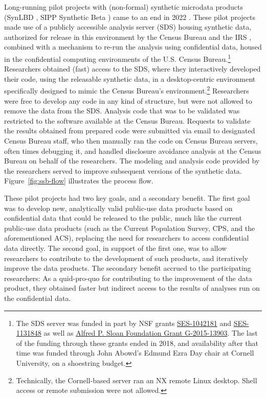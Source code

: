 \documentclass[inline]{hdsr}
\begin{document}
Long-running pilot projects with (non-formal) synthetic microdata products (SynLBD \citep{KinneyEtAl2011,us_census_bureau_synthetic_2011,vilhuber_codebook_2013}, SIPP Synthetic Beta \citep{Benedettoetal_2013,us_census_bureau_sipp_2015,reeder_codebook_2018}) came to an end in 2022 \citep{vilhuber_end_2022}. These pilot projects made use of a publicly accessible analysis server  (\acf{SDS}) housing synthetic data, authorized for release in this environment by the Census Bureau and the IRS \citep[e.g.][]{us_census_bureau_disclosure_2015}, combined with a mechanism to re-run the analysis using confidential data, housed in the confidential computing environments of the U.S. Census Bureau.\footnote{The \ac{SDS} server was funded in part by NSF grants \href{http://www.nsf.gov/awardsearch/showAward.do?AwardNumber=1042181}{SES-1042181} and \href{http://www.nsf.gov/awardsearch/showAward.do?AwardNumber=1131848}{SES-1131848} as well as \href{https://sloan.org/grant-detail/6845}{Alfred P. Sloan Foundation Grant G-2015-13903}. The last of the funding through these grants ended in 2018, and availability after that time was funded through John Abowd's Edmund Ezra Day chair at Cornell University, on a shoestring budget.} Researchers obtained (fast) access to the \ac{SDS}, where they interactively developed their code, using the releasable synthetic data, in a desktop-centric environment specifically designed to mimic the Census Bureau's environment.\footnote{Technically, the Cornell-based server ran an NX remote Linux desktop. Shell access or remote submission were not allowed.} Researchers were free to develop any code in any kind of structure, but were not allowed to remove the data from the \ac{SDS}. Analysis code that was to be validated was restricted to the software available at the Census Bureau. Requests to validate the results obtained from prepared code were submitted via email to designated Census Bureau staff, who then manually ran the code on Census Bureau servers, often times debugging it, and handled disclosure avoidance analysis at the Census Bureau on behalf of the researchers. The modeling and analysis code provided by the researchers served to improve subsequent versions of the synthetic data. Figure~\ref{fig:ssb-flow} illustrates the process flow.

These pilot projects had two key goals, and a secondary benefit. The first goal was to develop new, analytically valid public-use data products based on confidential data that could be released to the public, much like the current public-use data products (such as the Current Population Survey, CPS, and the aforementioned \ac{ACS}), replacing the need for researchers to access confidential data directly. The second goal, in support of the first one, was to allow researchers to contribute to the development of such products, and iteratively improve the data products. The secondary benefit accrued to the participating researchers: As a quid-pro-quo for contributing to the improvement of the data product, they obtained faster but indirect access to the results of analyses run on the confidential data. 
\end{document}

